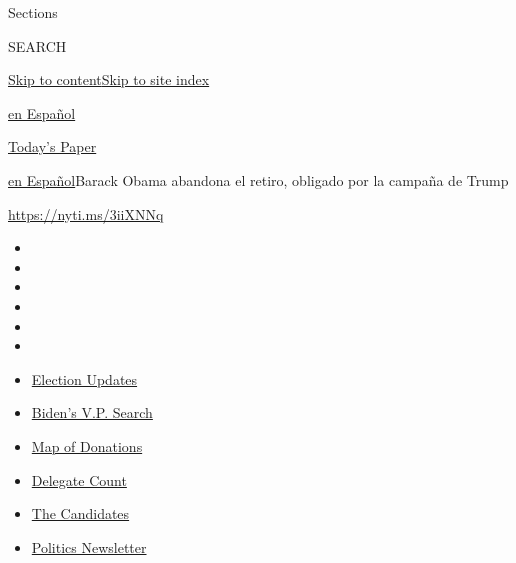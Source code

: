 Sections

SEARCH

\protect\hyperlink{site-content}{Skip to
content}\protect\hyperlink{site-index}{Skip to site index}

\href{https://www.nytimes.com/es/}{en Español}

\href{https://myaccount.nytimes.com/auth/login?response_type=cookie\&client_id=vi}{}

\href{https://www.nytimes.com/section/todayspaper}{Today's Paper}

\href{/es/}{en Español}\textbar{}Barack Obama abandona el retiro,
obligado por la campaña de Trump

\url{https://nyti.ms/3iiXNNq}

\begin{itemize}
\item
\item
\item
\item
\item
\item
\end{itemize}

\begin{itemize}
\item
  \href{https://www.nytimes.com/2020/07/31/us/elections/biden-vs-trump.html?action=click\&pgtype=Article\&state=default\&region=TOP_BANNER\&context=storylines_menu}{Election
  Updates}
\item
  \href{https://www.nytimes.com/article/biden-vice-president-2020.html?action=click\&pgtype=Article\&state=default\&region=TOP_BANNER\&context=storylines_menu}{Biden's
  V.P. Search}
\item
  \href{https://www.nytimes.com/interactive/2020/07/24/us/politics/trump-biden-campaign-donors.html?action=click\&pgtype=Article\&state=default\&region=TOP_BANNER\&context=storylines_menu}{Map
  of Donations}
\item
  \href{https://www.nytimes.com/interactive/2020/us/elections/delegate-count-primary-results.html?action=click\&pgtype=Article\&state=default\&region=TOP_BANNER\&context=storylines_menu}{Delegate
  Count}
\item
  \href{https://www.nytimes.com/interactive/2019/us/politics/2020-presidential-candidates.html?action=click\&pgtype=Article\&state=default\&region=TOP_BANNER\&context=storylines_menu}{The
  Candidates}
\item
  \href{https://www.nytimes.com/newsletters/politics?action=click\&pgtype=Article\&state=default\&region=TOP_BANNER\&context=storylines_menu}{Politics
  Newsletter}
\end{itemize}

